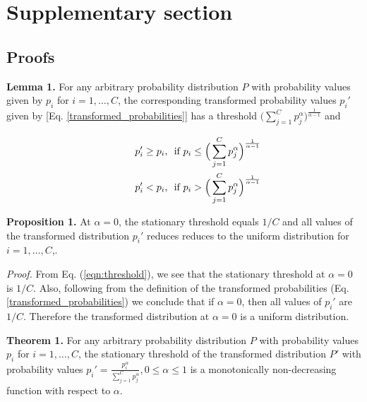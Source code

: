 \documentclass[runningheads]{llncs}
\begin{document}



\clearpage

\section{Supplementary section}
\label{sec:Supp}

\subsection{Proofs}
\label{sec:proofs}

\textbf{Lemma 1.} For any arbitrary probability distribution $P$ with probability values
given by $p_i$ for $i=1,\dots,C$, the corresponding transformed probability values
$p_i'$ given by [Eq. \ref{transformed_probabilities}] has a threshold $\Big(\sum
_{j=1}^C p_j^{\alpha}\Big)^{\frac{1}{\alpha-1}}$ and

\begin{equation} \begin{split} p_i' \geq p_i & \text{,\ \ if } p_i \leq
\Big(\sum _{j=1}^C p_j^{\alpha }\Big)^{\frac{1}{\alpha-1}} \\ \hspace*{1cm}
p_i' < p_i & \text{,\ \ if } p_i > \Big(\sum _{j=1}^C
p_j^{\alpha}\Big)^{\frac{1}{\alpha-1}} \end{split} \label{eqn:threshold}
\end{equation}


\textbf{Proposition 1.} At $\alpha=0$, the stationary threshold equals $1/C$ and all
values of the transformed distribution $p_i'$ reduces reduces to the uniform
distribution for $i=1,\dots,C$,.

\textit{Proof.} From Eq. (\ref{eqn:threshold}), we see that the stationary threshold at
$\alpha=0$ is $1/C$. Also, following from the definition of the transformed
probabilities (Eq. \ref{transformed_probabilities}) we conclude that if $\alpha=0$, then
all values of $p_i'$ are $1/C$. Therefore the transformed distribution at $\alpha=0$ is
a uniform distribution.



\textbf{Theorem 1.} For any arbitrary probability distribution $P$ with probability
values $p_i$ for $i=1,\dots,C$, the stationary threshold of the transformed distribution
$P'$ with probability values $p_i'=\frac{p_i^{\alpha}}{\sum _{j=1}^C p_j^\alpha}, 0 \leq
\alpha \leq 1$ is a monotonically non-decreasing function with respect to $\alpha$.
\end{document}
